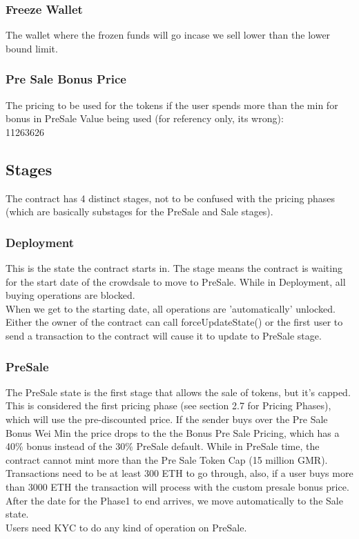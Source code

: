 \documentclass[11pt]{article} %
\begin{document}
\subsubsection{Freeze Wallet}
The wallet where the frozen funds will go incase we sell lower than the lower bound limit.


\subsubsection{Pre Sale Bonus Price}
The pricing to be used for the tokens if the user spends more than the min for bonus in PreSale
Value being used (for referency only, its wrong): \\
11263626

\subsection{Stages}
The contract has 4 distinct stages, not to be confused with the pricing phases (which are basically substages for the PreSale and Sale stages).

\subsubsection{Deployment}
This is the state the contract starts in. The stage means the contract is waiting for the start date of the crowdsale to move to PreSale.
While in Deployment, all buying operations are blocked.\\
When we get to the starting date, all operations are 'automatically' unlocked. Either the owner of the contract can call forceUpdateState() or the first user to send a transaction to the contract will cause it to update to PreSale stage.

\subsubsection{PreSale}
The PreSale state is the first stage that allows the sale of tokens, but it's capped. This is considered the first pricing phase (see section 2.7 for Pricing Phases), which will use the pre-discounted price. If the sender buys over the Pre Sale Bonus Wei Min the price drops to the the Bonus Pre Sale Pricing, which has a 40\% bonus instead of the 30\% PreSale default.
While in PreSale time, the contract cannot mint more than the Pre Sale Token Cap (15 million GMR). \\
Transactions need to be at least 300 ETH to go through, also, if a user buys more than 3000 ETH the transaction will process with the custom presale bonus price.\\
After the date for the Phase1 to end arrives, we move automatically to the Sale state.\\
Users need KYC to do any kind of operation on PreSale.
 
\end{document}

